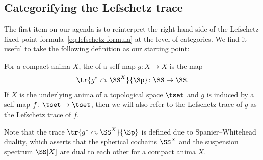

\subsection{Categorifying the Lefschetz trace}
The first item on our agenda is to reinterpret the right-hand side of the Lefschetz fixed point formula~\eqref{eq:lefschetz-formula} at the level of categories. We find it useful to take the following definition as our starting point:

\begin{defn}\label{defn: lefschetz trace}
  For a compact anima $X$, the  of a self-map $g\colon X\to X$ is the map
  $$
  \tr{g^*\curvearrowright\SS^X}{\Sp}\colon\SS\to\SS.
  $$
  If $X$ is the underlying anima of a topological space $\tset$ and $g$ is induced by a self-map $f\colon\tset\to\tset$, then we will also refer to the Lefschetz trace of $g$ as the Lefschetz trace of $f$.
\end{defn}

Note that the trace $\tr{g^*\curvearrowright\SS^X}{\Sp}$ is defined due to Spanier--Whitehead duality, which asserts that the spherical cochains $\SS^X$ and the suspension spectrum $\SS\lbrack X\rbrack$ are dual to each other for a compact anima $X$.

\medskip

